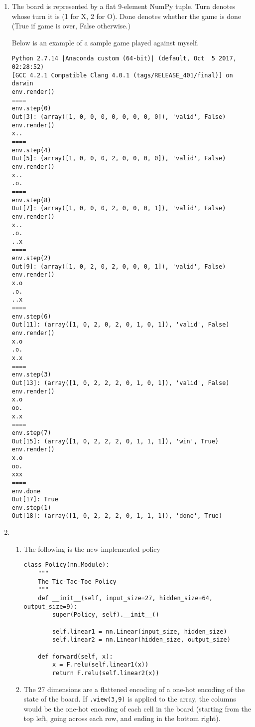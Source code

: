\documentclass[10pt,letterpaper]{article}
\begin{document}
	\begin{enumerate}
		\item %
		The board is represented by a flat 9-element NumPy tuple.
		Turn denotes whose turn it is (1 for X, 2 for O).
		Done denotes whether the game is done (True if game is over, False otherwise.)

		Below is an example of a sample game played against myself.
		\begin{verbatim}
Python 2.7.14 |Anaconda custom (64-bit)| (default, Oct  5 2017, 02:28:52)
[GCC 4.2.1 Compatible Clang 4.0.1 (tags/RELEASE_401/final)] on darwin
env.render()
====
env.step(0)
Out[3]: (array([1, 0, 0, 0, 0, 0, 0, 0, 0]), 'valid', False)
env.render()
x..
====
env.step(4)
Out[5]: (array([1, 0, 0, 0, 2, 0, 0, 0, 0]), 'valid', False)
env.render()
x..
.o.
====
env.step(8)
Out[7]: (array([1, 0, 0, 0, 2, 0, 0, 0, 1]), 'valid', False)
env.render()
x..
.o.
..x
====
env.step(2)
Out[9]: (array([1, 0, 2, 0, 2, 0, 0, 0, 1]), 'valid', False)
env.render()
x.o
.o.
..x
====
env.step(6)
Out[11]: (array([1, 0, 2, 0, 2, 0, 1, 0, 1]), 'valid', False)
env.render()
x.o
.o.
x.x
====
env.step(3)
Out[13]: (array([1, 0, 2, 2, 2, 0, 1, 0, 1]), 'valid', False)
env.render()
x.o
oo.
x.x
====
env.step(7)
Out[15]: (array([1, 0, 2, 2, 2, 0, 1, 1, 1]), 'win', True)
env.render()
x.o
oo.
xxx
====
env.done
Out[17]: True
env.step(1)
Out[18]: (array([1, 0, 2, 2, 2, 0, 1, 1, 1]), 'done', True)
		\end{verbatim}
		\item %
		\begin{enumerate}
			\item %
			The following is the new implemented policy
\begin{lstlisting}
class Policy(nn.Module):
    """
    The Tic-Tac-Toe Policy
    """
    def __init__(self, input_size=27, hidden_size=64, output_size=9):
        super(Policy, self).__init__()

        self.linear1 = nn.Linear(input_size, hidden_size)
        self.linear2 = nn.Linear(hidden_size, output_size)

    def forward(self, x):
        x = F.relu(self.linear1(x))
        return F.relu(self.linear2(x))
\end{lstlisting}
			\item %
			The 27 dimensions are a flattened encoding of a one-hot encoding of the state of the board.
			If \verb|.view(3,9)| is applied to the array, the columns would be the one-hot encoding of each cell in the board (starting from the top left, going across each row, and ending in the bottom right).


\end{enumerate}
\end{enumerate}
\end{document}
